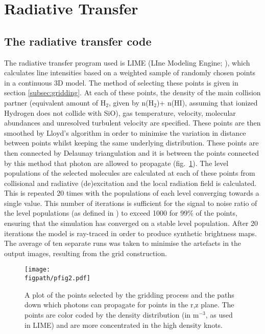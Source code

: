 \documentclass[useAMS,usenatbib]{mn2e}
\newcommand{\figpath}{/home/phybva/SiOJets_New/PAPER/NEWFIGS}
\begin{document}
\section{Radiative Transfer}
\label{sec:radtrans}

\subsection{The radiative transfer code} \label{subsec:radiative_transfer_code}
The radiative transfer program used is LIME (LIne Modeling Engine;
\citealt{Brinch:2010p13078}), which  calculates line intensities based
on a weighted sample of randomly chosen points in a continuous 3D
model. The method of selecting these points is given in section
\ref{subsec:gridding}. At each of these points, the density of the
main collision partner (equivalent amount of H$_2$, given by n(H$_2$)+
n(HI), assuming that ionized Hydrogen does not collide with SiO), gas temperature, velocity, molecular abundances and unresolved turbulent velocity are specified. These points are then smoothed by Lloyd's algorithm \citep{Lloyd1982} in order to minimise the variation in distance between points whilst keeping the same underlying distribution. These points are then connected by Delaunay triangulation and it is between the points connected by this method that photon are allowed to propagate (fig.~\ref{grid}). The level populations of the selected molecules are calculated at each of these points from collisional and radiative (de)excitation and the local radiation field is calculated. This is repeated 20 times with the populations of each level converging towards a single value. This number of iterations is sufficient for the signal to noise ratio of the level populations (as defined in \citealt{Brinch:2010p13078}) to exceed 1000 for 99\% of the points, ensuring that the simulation has converged on a stable level population. After 20 iterations the model is ray-traced in order to produce synthetic brightness maps. The average of ten separate runs was taken to minimise the artefacts in the output images, resulting from the grid construction.%


\begin{figure}
 \texttt{[image: \\figpath/pfig2.pdf]}%
 \caption{A plot of the points selected by the gridding process and the paths down which photons can propagate for points in the r,z plane. The points are color coded by the density distribution (in m$^{-3}$, as used in LIME) and are more concentrated in the high density knots.}
\label{grid} %
\end{figure}
\end{document}
